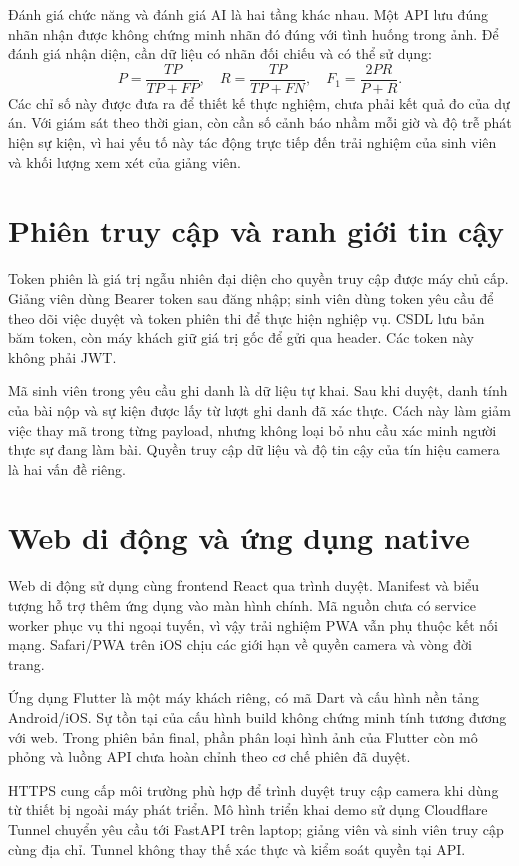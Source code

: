 Đánh giá chức năng và đánh giá AI là hai tầng khác nhau. Một API lưu đúng nhãn nhận được không chứng minh nhãn đó đúng với tình huống trong ảnh. Để đánh giá nhận diện, cần dữ liệu có nhãn đối chiếu và có thể sử dụng:
\begin{equation}
 P=\frac{TP}{TP+FP},\quad R=\frac{TP}{TP+FN},\quad F_1=\frac{2PR}{P+R}.
\end{equation}
Các chỉ số này được đưa ra để thiết kế thực nghiệm, chưa phải kết quả đo của dự án. Với giám sát theo thời gian, còn cần số cảnh báo nhầm mỗi giờ và độ trễ phát hiện sự kiện, vì hai yếu tố này tác động trực tiếp đến trải nghiệm của sinh viên và khối lượng xem xét của giảng viên.


\section{Phiên truy cập và ranh giới tin cậy}
Token phiên là giá trị ngẫu nhiên đại diện cho quyền truy cập được máy chủ cấp. Giảng viên dùng Bearer token sau đăng nhập; sinh viên dùng token yêu cầu để theo dõi việc duyệt và token phiên thi để thực hiện nghiệp vụ. CSDL lưu bản băm token, còn máy khách giữ giá trị gốc để gửi qua header. Các token này không phải JWT.

Mã sinh viên trong yêu cầu ghi danh là dữ liệu tự khai. Sau khi duyệt, danh tính của bài nộp và sự kiện được lấy từ lượt ghi danh đã xác thực. Cách này làm giảm việc thay mã trong từng payload, nhưng không loại bỏ nhu cầu xác minh người thực sự đang làm bài. Quyền truy cập dữ liệu và độ tin cậy của tín hiệu camera là hai vấn đề riêng.

\section{Web di động và ứng dụng native}
Web di động sử dụng cùng frontend React qua trình duyệt. Manifest và biểu tượng hỗ trợ thêm ứng dụng vào màn hình chính. Mã nguồn chưa có service worker phục vụ thi ngoại tuyến, vì vậy trải nghiệm PWA vẫn phụ thuộc kết nối mạng. Safari/PWA trên iOS chịu các giới hạn về quyền camera và vòng đời trang.

Ứng dụng Flutter là một máy khách riêng, có mã Dart và cấu hình nền tảng Android/iOS. Sự tồn tại của cấu hình build không chứng minh tính tương đương với web. Trong phiên bản final, phần phân loại hình ảnh của Flutter còn mô phỏng và luồng API chưa hoàn chỉnh theo cơ chế phiên đã duyệt.

HTTPS cung cấp môi trường phù hợp để trình duyệt truy cập camera khi dùng từ thiết bị ngoài máy phát triển. Mô hình triển khai demo sử dụng Cloudflare Tunnel chuyển yêu cầu tới FastAPI trên laptop; giảng viên và sinh viên truy cập cùng địa chỉ. Tunnel không thay thế xác thực và kiểm soát quyền tại API.

